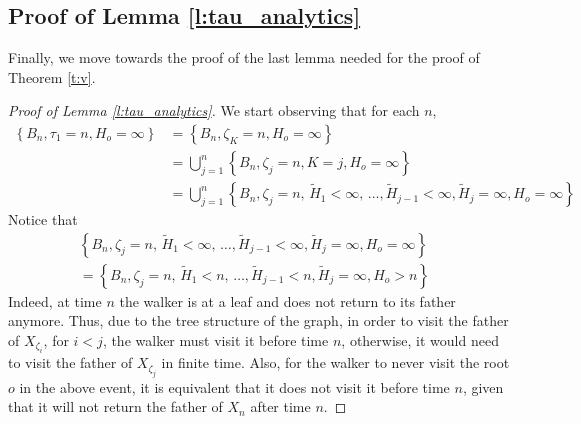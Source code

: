 \documentclass[a4paper]{amsart}
\newcommand{\hitfetak}{\widetilde{H}}
\newcommand{\Lbrace}{\left\lbrace}
\newcommand{\Rbrace}{\right\rbrace}
\begin{document}
\subsection{Proof of Lemma \ref{l:tau_analytics}} Finally, we move towards the proof of the last lemma needed for the proof of Theorem \ref{t:v}.
\begin{proof}[Proof of Lemma \ref{l:tau_analytics}]
    We start observing that for each $n$, 
    \begin{equation}\label{eq:taueqn}
        \begin{split}
            \Lbrace B_n, \tau_1 = n, H_o = \infty \Rbrace & = \Lbrace B_n, \zeta_K = n, H_o = \infty \Rbrace \\
            & = \bigcup_{j=1}^n \Lbrace B_n, \zeta_j = n, K = j, H_o = \infty \Rbrace \\ 
            & = \bigcup_{j=1}^n \Lbrace B_n, \zeta_j = n,\, \hitfetak_1 < \infty,\, \dots, \hitfetak_{j-1} <\infty, \hitfetak_j = \infty, H_o = \infty \Rbrace
        \end{split}
    \end{equation}
Notice that
\begin{equation}\label{eq:eventidentity}
    \begin{split}
        \Lbrace B_n,\zeta_j = n,\, \hitfetak_1 < \infty,\, \dots, \hitfetak_{j-1} <\infty, \hitfetak_j = \infty, H_o = \infty \Rbrace & \\
         = \Lbrace B_n, \zeta_j = n,\, \hitfetak_1 < n,\, \dots, \hitfetak_{j-1} < n, \hitfetak_j = \infty, H_o >n\Rbrace
    \end{split}
\end{equation}
Indeed, at time $n$ the walker is at a leaf and does not return to its father anymore. Thus, due to the tree structure of the graph, in order to visit the father of $X_{\zeta_i}$, for $i<j$, the walker must visit it before time $n$, otherwise, it would need to visit the father of $X_{\zeta_j}$ in finite time. Also, for the walker to never visit the root $o$ in the above event, it is equivalent that it does not visit it before time $n$, given that it will not return the father of $X_n$ after time $n$.
    

\end{proof}
\end{document}
